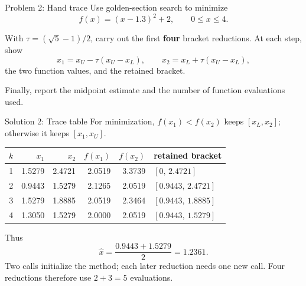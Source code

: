 \documentclass[aspectratio=169,11pt,t]{beamer}
\begin{document}
\begin{frame}{Problem 2: Hand trace}
  Use golden-section search to minimize
  \[
    f(x)=(x-1.3)^2+2, \qquad 0\le x\le4.
  \]

  With \(\tau=(\sqrt5-1)/2\), carry out the first \textbf{four} bracket
  reductions. At each step, show
  \[
    x_1=x_U-\tau(x_U-x_L),
    \qquad
    x_2=x_L+\tau(x_U-x_L),
  \]
  the two function values, and the retained bracket.

  Finally, report the midpoint estimate and the number of function
  evaluations used.
\end{frame}

\begin{frame}{Solution 2: Trace table}
  For minimization, \(f(x_1)<f(x_2)\) keeps \([x_L,x_2]\); otherwise it keeps
  \([x_1,x_U]\).

  {\centering
  \fontsize{12.5}{15}\selectfont
  \setlength{\tabcolsep}{3.5pt}
  \begin{tabular}{c r r r r l}
    \toprule
    \(k\) & \(x_1\) & \(x_2\) & \(f(x_1)\) & \(f(x_2)\) & retained bracket \\
    \midrule
    1 & 1.5279 & 2.4721 & 2.0519 & 3.3739 & \([0,\,2.4721]\) \\
    2 & 0.9443 & 1.5279 & 2.1265 & 2.0519 & \([0.9443,\,2.4721]\) \\
    3 & 1.5279 & 1.8885 & 2.0519 & 2.3464 & \([0.9443,\,1.8885]\) \\
    4 & 1.3050 & 1.5279 & 2.0000 & 2.0519 & \([0.9443,\,1.5279]\) \\
    \bottomrule
  \end{tabular}\par}

  \vspace{0.18cm}
  Thus
  \[
    \widehat{x}=\frac{0.9443+1.5279}{2}=\boxed{1.2361}.
  \]
  Two calls initialize the method; each later reduction needs one new call.
  Four reductions therefore use \(2+3=\boxed{5}\) evaluations.

\end{frame}
\end{document}
